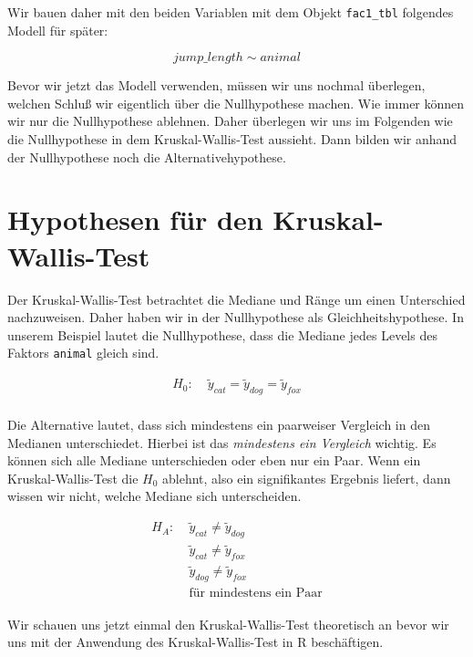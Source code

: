 \documentclass[
  letterpaper,
]{scrbook}
\begin{document}
Wir bauen daher mit den beiden Variablen mit dem Objekt
\texttt{fac1\_tbl} folgendes Modell für später:

\[
jump\_length \sim animal
\]

Bevor wir jetzt das Modell verwenden, müssen wir uns nochmal überlegen,
welchen Schluß wir eigentlich über die Nullhypothese machen. Wie immer
können wir nur die Nullhypothese ablehnen. Daher überlegen wir uns im
Folgenden wie die Nullhypothese in dem Kruskal-Wallis-Test aussieht.
Dann bilden wir anhand der Nullhypothese noch die Alternativehypothese.

\hypertarget{hypothesen-fuxfcr-den-kruskal-wallis-test}{%
\section{Hypothesen für den
Kruskal-Wallis-Test}\label{hypothesen-fuxfcr-den-kruskal-wallis-test}}

Der Kruskal-Wallis-Test betrachtet die Mediane und Ränge um einen
Unterschied nachzuweisen. Daher haben wir in der Nullhypothese als
Gleichheitshypothese. In unserem Beispiel lautet die Nullhypothese, dass
die Mediane jedes Levels des Faktors \texttt{animal} gleich sind.

\[
\begin{align*}
H_0: &\; \widetilde{y}_{cat} = \widetilde{y}_{dog} = \widetilde{y}_{fox}\\
\end{align*}
\]

Die Alternative lautet, dass sich mindestens ein paarweiser Vergleich in
den Medianen unterschiedet. Hierbei ist das \emph{mindestens ein
Vergleich} wichtig. Es können sich alle Mediane unterschieden oder eben
nur ein Paar. Wenn ein Kruskal-Wallis-Test die \(H_0\) ablehnt, also ein
signifikantes Ergebnis liefert, dann wissen wir nicht, welche Mediane
sich unterscheiden.

\[
\begin{align*}
H_A: &\; \widetilde{y}_{cat} \ne \widetilde{y}_{dog}\\
\phantom{H_A:} &\; \widetilde{y}_{cat} \ne \widetilde{y}_{fox}\\
\phantom{H_A:} &\; \widetilde{y}_{dog} \ne \widetilde{y}_{fox}\\
\phantom{H_A:} &\; \mbox{für mindestens ein Paar}
\end{align*}
\]

Wir schauen uns jetzt einmal den Kruskal-Wallis-Test theoretisch an
bevor wir uns mit der Anwendung des Kruskal-Wallis-Test in R
beschäftigen.
\end{document}
